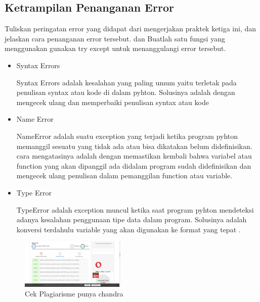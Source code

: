 \subsection{Ketrampilan Penanganan Error}
Tuliskan peringatan error yang didapat dari mengerjakan praktek ketiga ini, dan jelaskan cara penanganan error tersebut. dan Buatlah satu fungsi yang menggunakan gunakan try except untuk menanggulangi error tersebut.
\begin{itemize}
\item Syntax Errors

Syntax Errors adalah kesalahan yang paling umum yaitu terletak pada penulisan syntax atau kode di dalam pyhton. Solusinya adalah dengan mengecek ulang dan memperbaiki penulisan syntax atau kode	

\item Name Error

NameError adalah suatu exception yang terjadi ketika program pyhton memanggil sesuatu yang tidak ada atau bisa dikatakan belum didefinisikan. cara mengatasinya adalah dengan memastikan kembali bahwa variabel atau function yang akan dipanggil ada didalam program sudah didefinisikan dan mengecek ulang penulisan dalam pemanggilan function atau variable.

\item Type Error

TypeError adalah exception muncul ketika saat program pyhton mendeteksi adanya kesalahan penggunaan tipe data dalam program. Solusinya adalah konversi terdahulu variable yang akan digunakan ke format yang tepat .

\end{itemize}

\begin{figure}[ht!]
	\includegraphics[width=5cm]{figures/5/1174079/plagiarisme_praktek.png}
	\centering
	\caption{Cek Plagiarisme punya chandra}
\end{figure}

